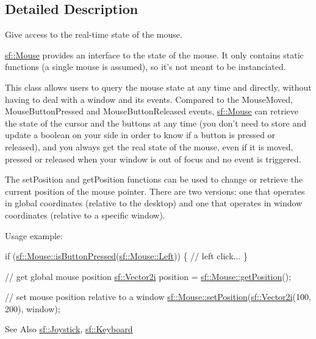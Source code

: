 \subsection{Detailed Description}
Give access to the real-\/time state of the mouse. 

\hyperlink{classsf_1_1Mouse}{sf\-::\-Mouse} provides an interface to the state of the mouse. It only contains static functions (a single mouse is assumed), so it's not meant to be instanciated.

This class allows users to query the mouse state at any time and directly, without having to deal with a window and its events. Compared to the Mouse\-Moved, Mouse\-Button\-Pressed and Mouse\-Button\-Released events, \hyperlink{classsf_1_1Mouse}{sf\-::\-Mouse} can retrieve the state of the cursor and the buttons at any time (you don't need to store and update a boolean on your side in order to know if a button is pressed or released), and you always get the real state of the mouse, even if it is moved, pressed or released when your window is out of focus and no event is triggered.

The set\-Position and get\-Position functions can be used to change or retrieve the current position of the mouse pointer. There are two versions\-: one that operates in global coordinates (relative to the desktop) and one that operates in window coordinates (relative to a specific window).

Usage example\-: 
\begin{DoxyCode}
\textcolor{keywordflow}{if} (\hyperlink{classsf_1_1Mouse_ab647159eb88e369a0332a9c5a7ba6687}{sf::Mouse::isButtonPressed}(\hyperlink{classsf_1_1Mouse_a4fb128be433f9aafe66bc0c605daaa90a8bb4856e1ec7f6b6a8605effdfc0eee8}{sf::Mouse::Left}))
\{
    \textcolor{comment}{// left click...}
\}

\textcolor{comment}{// get global mouse position}
\hyperlink{classsf_1_1Vector2}{sf::Vector2i} position = \hyperlink{classsf_1_1Mouse_ac368680f797b7f6e4f50b5b7928c1387}{sf::Mouse::getPosition}();

\textcolor{comment}{// set mouse position relative to a window}
\hyperlink{classsf_1_1Mouse_a1222e16c583be9e3d176d86e0b7817d7}{sf::Mouse::setPosition}(\hyperlink{classsf_1_1Vector2}{sf::Vector2i}(100, 200), window);
\end{DoxyCode}


\begin{DoxySeeAlso}{See Also}
\hyperlink{classsf_1_1Joystick}{sf\-::\-Joystick}, \hyperlink{classsf_1_1Keyboard}{sf\-::\-Keyboard} 
\end{DoxySeeAlso}


